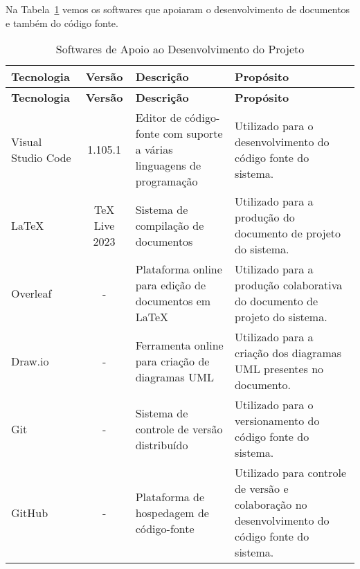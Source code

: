 
Na Tabela~\ref{tabela-software} vemos os softwares que apoiaram o desenvolvimento de documentos e também do código fonte.

\begin{footnotesize}
	\begin{longtable}{|p{2.5cm}|c|p{5cm}|p{5.5cm}|}
		\caption{Softwares de Apoio ao Desenvolvimento do Projeto}
		\label{tabela-software}                                                                                                                                                                                        \\\hline

		\rowcolor{lightgray}
		\textbf{Tecnologia} & \textbf{Versão} & \textbf{Descrição}                                                    & \textbf{Propósito}                                                                             \\\hline
		\endfirsthead
		\hline
		\rowcolor{lightgray}
		\textbf{Tecnologia} & \textbf{Versão} & \textbf{Descrição}                                                    & \textbf{Propósito}                                                                             \\\hline
		\endhead

		Visual Studio Code  & 1.105.1         & Editor de código-fonte com suporte a várias linguagens de programação & Utilizado para o desenvolvimento do código fonte do sistema.                                   \\ \hline
		\LaTeX              & TeX Live 2023   & Sistema de compilação de documentos                                   & Utilizado para a produção do documento de projeto do sistema.                                  \\ \hline
		Overleaf            & -               & Plataforma online para edição de documentos em \LaTeX                 & Utilizado para a produção colaborativa do documento de projeto do sistema.                     \\ \hline
		Draw.io             & -               & Ferramenta online para criação de diagramas UML                       & Utilizado para a criação dos diagramas UML presentes no documento.                             \\ \hline
		Git                 & -               & Sistema de controle de versão distribuído                             & Utilizado para o versionamento do código fonte do sistema.                                     \\ \hline
		GitHub              & -               & Plataforma de hospedagem de código-fonte                              & Utilizado para controle de versão e colaboração no desenvolvimento do código fonte do sistema. \\ \hline
	\end{longtable}
\end{footnotesize}
